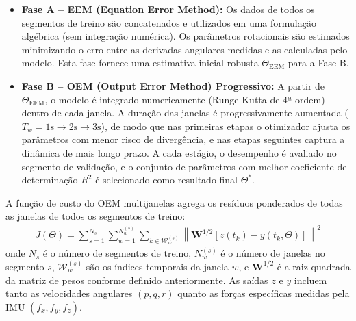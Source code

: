\documentclass[letterpaper, 10 pt, conference]{ieeeconf}
\begin{document}
\begin{itemize}
    \item \textbf{Fase A -- EEM (Equation Error Method):} Os dados de todos os segmentos de treino são concatenados e utilizados em uma formulação algébrica (sem integração numérica). Os parâmetros rotacionais são estimados minimizando o erro entre as derivadas angulares medidas e as calculadas pelo modelo. Esta fase fornece uma estimativa inicial robusta $\Theta_{\text{EEM}}$ para a Fase B.
    \item \textbf{Fase B -- OEM (Output Error Method) Progressivo:} A partir de $\Theta_{\text{EEM}}$, o modelo é integrado numericamente (Runge-Kutta de 4ª ordem) dentro de cada janela. A duração das janelas é progressivamente aumentada ($T_w = 1\text{s} \to 2\text{s} \to 3\text{s}$), de modo que nas primeiras etapas o otimizador ajusta os parâmetros com menor risco de divergência, e nas etapas seguintes captura a dinâmica de mais longo prazo. A cada estágio, o desempenho é avaliado no segmento de validação, e o conjunto de parâmetros com melhor coeficiente de determinação $R^2$ é selecionado como resultado final $\Theta^*$.
\end{itemize}

A função de custo do OEM multijanelas agrega os resíduos ponderados de todas as janelas de todos os segmentos de treino:
\begin{align}
J(\Theta) = \sum_{s=1}^{N_s} \sum_{w=1}^{N_w^{(s)}} \sum_{k \in \mathcal{W}_w^{(s)}} \left\| \mathbf{W}^{1/2} \left[ z(t_k) - y(t_k, \Theta) \right] \right\|^2
\end{align}
onde $N_s$ é o número de segmentos de treino, $N_w^{(s)}$ é o número de janelas no segmento $s$, $\mathcal{W}_w^{(s)}$ são os índices temporais da janela $w$, e $\mathbf{W}^{1/2}$ é a raiz quadrada da matriz de pesos conforme definido anteriormente. As saídas $z$ e $y$ incluem tanto as velocidades angulares $(p, q, r)$ quanto as forças específicas medidas pela IMU $(f_x, f_y, f_z)$.
\end{document}
